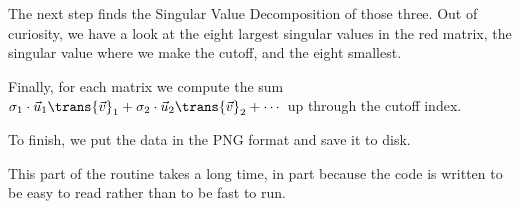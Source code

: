 The next step finds the Singular Value Decomposition of those three.
Out of curiosity, we have a look at the eight largest singular
values in the red matrix, the singular value where we make the cutoff,
and the eight smallest.


Finally, for each matrix we compute the sum
$\sigma_1\cdot\vec{u}_1\trans{\vec{v}}_1+\sigma_2\cdot\vec{u}_2\trans{\vec{v}}_2
   +\cdots$
up through the cutoff index.


To finish, we put the data in the PNG format and save it to 
disk.

This part of the routine takes a long time, in part because
the code is written to be easy to read rather than to be fast to run.

\endinput


TODO:
1) mention Sage matrices are not mutable in matrix introduction.
Is mutable discussed in Intro?

2) vectors have to be forced to be row or col

2) Need int() fcns?  copy() fcn?